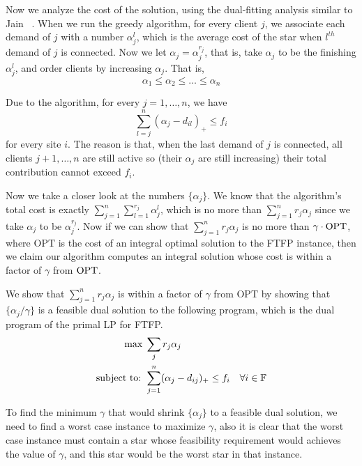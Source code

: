 \documentclass[oneside,final]{ucr}
\begin{document}
Now we analyze the cost of the solution, using the
dual-fitting analysis similar to Jain
{\etal}~\cite{JainMMSV03}. When we run the greedy algorithm,
for every client $j$, we associate each demand of $j$ with a
number $\alpha_j^l$, which is the average cost of the star
when $l^{th}$ demand of $j$ is connected. Now we let
$\alpha_j = \alpha_j^{r_j}$, that is, take $\alpha_j$ to be
the finishing $\alpha_j^l$, and order clients by increasing
$\alpha_j$. That is,
\begin{equation*}
  \alpha_1 \leq \alpha_2 \leq \ldots \leq \alpha_n
\end{equation*}

Due to the algorithm, for every $j=1,\ldots,n$, we have
\begin{equation*}
  \sum_{l=j}^n (\alpha_j - d_{il})_+ \leq f_i
\end{equation*}
for every site $i$.  The reason is that, when the last
demand of $j$ is connected, all clients $j+1,\ldots,n$ are
still active so (their $\alpha_j$ are still increasing)
their total contribution cannot exceed $f_i$.

Now we take a closer look at the numbers $\{\alpha_j\}$. We
know that the algorithm's total cost is exactly
$\sum_{j=1}^n \sum_{l=1}^{r_j} \alpha_j^l$, which is no more
than $\sum_{j=1}^n r_j \alpha_j$ since we take $\alpha_j$ to
be $\alpha_j^{r_j}$. Now if we can show that $\sum_{j=1}^n
r_j \alpha_j$ is no more than $\gamma \cdot \mbox{\rm OPT}$, where
$\textrm{OPT}$ is the cost of an integral optimal solution
to the FTFP instance, then we claim our algorithm computes
an integral solution whose cost is within a factor of
$\gamma$ from $\mbox{\rm OPT}$.

We show that $\sum_{j=1}^n r_j \alpha_j$ is within a factor
of $\gamma$ from $\textrm{OPT}$ by showing that
$\{\alpha_j/\gamma\}$ is a feasible dual solution to the
following program, which is the dual program of the primal
LP for FTFP.
\begin{align*}
  \max\; &\sum_j r_j\alpha_j\\
  \textrm{subject to: }& \sum_{j=1}^n (\alpha_j - d_{ij})_+
  \leq f_i \quad \forall i \in \mathbb{F}\\
\end{align*}

To find the minimum $\gamma$ that would shrink
$\{\alpha_j\}$ to a feasible dual solution, we need to find
a worst case instance to maximize $\gamma$, also it is clear
that the worst case instance must contain a star whose
feasibility requirement would achieves the value of
$\gamma$, and this star would be the worst star in that
instance.
\end{document}

